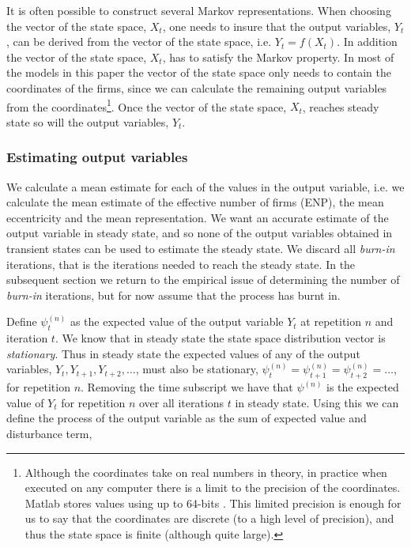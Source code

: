 \documentclass[preprint, 12pt]{elsarticle}
\begin{document}
It is often possible to construct several Markov representations. When choosing the vector of the state space, $X_t$, one needs to insure that the output variables, $Y_t$, can be derived from the vector of the state space, i.e. $Y_t = f(X_t)$. In addition the vector of the state space, $X_t$, has to satisfy the Markov property. In most of the models in this paper the vector of the state space only needs to contain the coordinates of the firms, since we can calculate the remaining output variables from the coordinates\footnote{Although the coordinates take on real numbers in theory, in practice when executed on any computer there is a limit to the precision of the coordinates. Matlab stores values using up to 64-bits \citep{MathWorks_2016}. This limited precision is enough for us to say that the coordinates are discrete (to a high level of precision), and thus the state space is finite (although quite large).}. Once the vector of the state space, $X_t$, reaches steady state so will the output variables, $Y_t$.

\subsubsection{Estimating output variables}

We calculate a mean estimate for each of the values in the output variable, i.e. we calculate the mean estimate of the effective number of firms (ENP), the mean eccentricity and the mean representation. We want an accurate estimate of the output variable in steady state, and so none of the output variables obtained in transient states can be used to estimate the steady state. We discard all \emph{burn-in} iterations, that is the iterations needed to reach the steady state. In the subsequent section we return to the empirical issue of determining the number of \emph{burn-in} iterations, but for now assume that the process has burnt in.

Define $\psi_t^{(n)}$ as the expected value of the output variable $Y_t$ at repetition $n$ and iteration $t$. We know that in steady state the state space distribution vector is \emph{stationary}. Thus in steady state the expected values of any of the output variables, $Y_t, Y_{t+1}, Y_{t+2}, \dots$, must also be stationary, $\psi_t^{(n)} = \psi_{t+1}^{(n)} = \psi_{t+2}^{(n)} = \dots$, for repetition $n$. Removing the time subscript we have that $\psi^{(n)}$ is the expected value of $Y_t$ for repetition $n$ over all iterations $t$ in steady state. Using this we can define the process of the output variable as the sum of expected value and disturbance term, 
\end{document}
